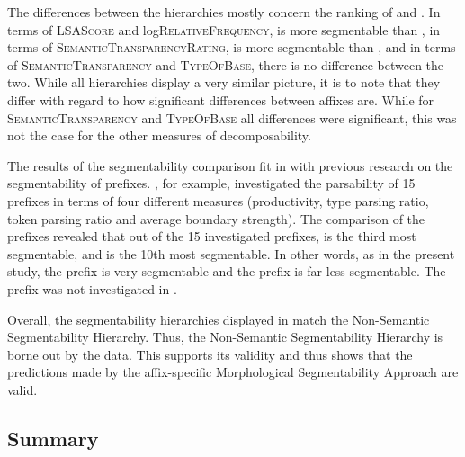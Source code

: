 The differences  between the hierarchies mostly concern the ranking of  and . In terms of \textsc{LSAScore} and log\textsc{RelativeFrequency},  is more segmentable than , in terms of \textsc{SemanticTransparencyRating},  is more segmentable than , and in terms of \textsc{SemanticTransparency} and \textsc{TypeOfBase}, there is no difference between the two. 
While all hierarchies display a very similar picture, it is to note that they differ with regard to how significant differences between affixes are. While for \textsc{SemanticTransparency} and \textsc{TypeOfBase} all differences were significant, this was not the case for the other measures of decomposability. 


The results of the segmentability comparison fit in with previous research on the segmentability of prefixes. \cite{Zirkel.2010}, for example, investigated the parsability of 15 prefixes in terms of four different measures (productivity, type parsing ratio, token parsing ratio and average boundary strength). The comparison of the prefixes revealed that out of the 15 investigated prefixes,  is the third most segmentable, and  is the 10th most segmentable. In other words, as in the present study, the prefix  is very segmentable and the prefix  is far less segmentable. The prefix  was not investigated in \cite{Zirkel.2010}. 

Overall, the segmentability hierarchies displayed in  match the Non-Semantic Segmentability Hierarchy. Thus, the Non-Semantic Segmentability Hierarchy is borne out by the data. This supports its validity and thus shows that the predictions made by the affix-specific Morphological Segmentability Approach are valid.

\subsection{Summary } \label{summary decomposability corpus study}

